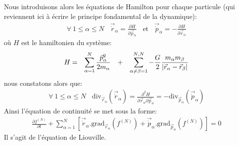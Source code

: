 Nous introduisons alors les équations de Hamilton pour chaque particule (qui reviennent ici à écrire le principe fondamental de la dynamique):
\begin{align*}
	\forall~1\leq\alpha\leq N~~~~\vec{\dot{r}}_{\alpha}=\frac{\partial H}{\partial\vec{p}_{\alpha}}~~~~\text{et}~~~~\vec{\dot{p}}_{\alpha
	}=-\frac{\partial H}{\partial\vec{r}_{\alpha}}
\end{align*}
où $H$ est le hamiltonien du système:
\begin{align*}
	\begin{array}[c]{cccc}
		H= & \displaystyle\sum\limits_{\alpha=1}^{N}\dfrac{\vec{p}_{\alpha}^{2}}{2m_{\alpha}} & + & \displaystyle\sum\limits_{\alpha\neq\beta=1}^{N,N}%
		-\dfrac{G}{2}\dfrac{m_{\alpha}m_{\beta}}{\left\vert \vec{r}_{\alpha}-\vec{r}_{\beta}\right\vert }%
	\end{array}
\end{align*}
nous constatons alors que:
\begin{align*}
	\forall~1\leq\alpha\leq N~~~~\mathrm{div}_{\vec{r}_{\alpha}}\left(\vec{\dot{r}}_{\alpha}\right)  =\frac{\partial^{2}H}{\partial
	\vec{r}_{\alpha}\partial\vec{p}_{\alpha}}=-\mathrm{div}_{\vec{p}_{\alpha}}\left(  \vec{\dot{p}}_{\alpha}\right)
\end{align*}
Ainsi l'équation de continuité se met sous la forme:
\begin{align}
	\frac{\partial f^{(N)}}{\partial t}+\sum_{\alpha=1}^{N}\left[  \vec{\dot{r}}_{\alpha}.\mathrm{grad}_{\vec{r}_{\alpha}}\left(  f^{(N)}\right)
	+\vec{\dot{p}}_{\alpha}.\mathrm{grad}_{\vec{p}_{\alpha}}\left(f^{(N)}\right)  \right]  =0\label{liouville}%
\end{align}
Il s'agit de l'équation de Liouville.

